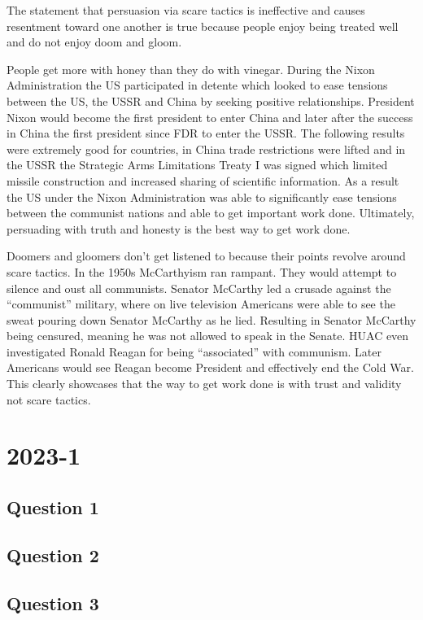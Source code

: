\documentclass[10pt]{article}
\begin{document}
The statement that persuasion via scare tactics is ineffective and causes resentment toward one another is true because people enjoy being treated well and do not enjoy doom and gloom.

People get more with honey than they do with vinegar. During the Nixon Administration the US participated in detente which looked to ease tensions between the US, the USSR and China by seeking positive relationships. President Nixon would become the first president to enter China and later after the success in China the first president since FDR to enter the USSR. The following results were extremely good for countries, in China trade restrictions were lifted and in the USSR the Strategic Arms Limitations Treaty I was signed which limited missile construction and increased sharing of scientific information. As a result the US under the Nixon Administration was able to significantly ease tensions between the communist nations and able to get important work done. Ultimately, persuading with truth and honesty is the best way to get work done.

Doomers and gloomers don’t get listened to because their points revolve around scare tactics. In the 1950s McCarthyism ran rampant. They would attempt to silence and oust all communists. Senator McCarthy led a crusade against the “communist” military, where on live television Americans were able to see the sweat pouring down Senator McCarthy as he lied. Resulting in Senator McCarthy being censured, meaning he was not allowed to speak in the Senate. HUAC even investigated Ronald Reagan for being “associated” with communism. Later Americans would see Reagan become President and effectively end the Cold War. This clearly showcases that the way to get work done is with trust and validity not scare tactics.

\section{2023-1}

\subsection{Question 1}

\subsection{Question 2}

\subsection{Question 3}
\end{document}
